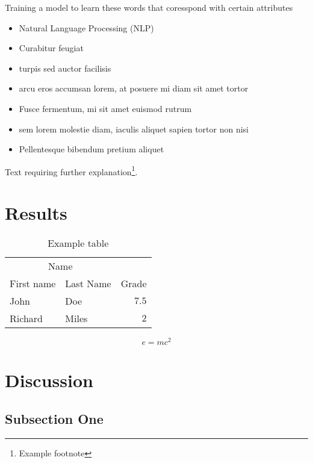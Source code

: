 \documentclass[twoside,twocolumn]{article}
\begin{document}
\indent Training a model to learn these words that coresspond with certain attributes     
\begin{itemize}
\item Natural Language Processing (NLP)
\item Curabitur feugiat
\item turpis sed auctor facilisis
\item arcu eros accumsan lorem, at posuere mi diam sit amet tortor
\item Fusce fermentum, mi sit amet euismod rutrum
\item sem lorem molestie diam, iaculis aliquet sapien tortor non nisi
\item Pellentesque bibendum pretium aliquet
\end{itemize}
\blindtext %

Text requiring further explanation\footnote{Example footnote}.


\section{Results}

\begin{table}
\caption{Example table}
\centering
\begin{tabular}{llr}
\toprule
\multicolumn{2}{c}{Name} \\
\cmidrule(r){1-2}
First name & Last Name & Grade \\
\midrule
John & Doe & $7.5$ \\
Richard & Miles & $2$ \\
\bottomrule
\end{tabular}
\end{table}

\blindtext %

\begin{equation}
\label{eq:emc}
e = mc^2
\end{equation}

\blindtext %


\section{Discussion}

\subsection{Subsection One}
\end{document}
